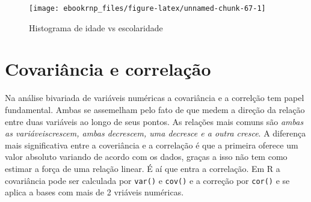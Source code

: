 \documentclass[12pt,]{style/krantz}
\makeatletter
\newenvironment{Shaded}{\begin{snugshade}}{\end{snugshade}}
\newcommand{\DataTypeTok}[1]{\textcolor[rgb]{0.13,0.29,0.53}{#1}}
\newcommand{\DecValTok}[1]{\textcolor[rgb]{0.00,0.00,0.81}{#1}}
\newcommand{\KeywordTok}[1]{\textcolor[rgb]{0.13,0.29,0.53}{\textbf{#1}}}
\newcommand{\NormalTok}[1]{#1}
\newcommand{\OperatorTok}[1]{\textcolor[rgb]{0.81,0.36,0.00}{\textbf{#1}}}
\newcommand{\OtherTok}[1]{\textcolor[rgb]{0.56,0.35,0.01}{#1}}
\newcommand{\StringTok}[1]{\textcolor[rgb]{0.31,0.60,0.02}{#1}}
\newenvironment{kframe}{%
\medskip{}
\setlength{\fboxsep}{.8em}
 \def\at@end@of@kframe{}%
 \ifinner\ifhmode%
  \def\at@end@of@kframe{\end{minipage}}%
  \begin{minipage}{\columnwidth}%
 \fi\fi%
 \def\FrameCommand##1{\hskip\@totalleftmargin \hskip-\fboxsep
 \colorbox{shadecolor}{##1}\hskip-\fboxsep
     \hskip-\linewidth \hskip-\@totalleftmargin \hskip\columnwidth}%
 \MakeFramed {\advance\hsize-\width
   \@totalleftmargin\z@ \linewidth\hsize
   \@setminipage}}%
 {\par\unskip\endMakeFramed%
 \at@end@of@kframe}
\renewenvironment{Shaded}{\begin{kframe}}{\end{kframe}}
\theoremstyle{definition}
\theoremstyle{definition}
\theoremstyle{definition}
\theoremstyle{remark}
\makeatother
\begin{document}
\begin{Shaded}
\end{Shaded}

\begin{figure}[H]

{\centering \texttt{[image: ebookrnp\_files/figure-latex/unnamed-chunk-67-1]} 

}

\caption{Histograma de idade vs escolaridade}\label{fig:unnamed-chunk-67}
\end{figure}

\hypertarget{covariancia-e-correlacao}{%
\section{Covariância e correlação}\label{covariancia-e-correlacao}}

Na análise bivariada de variáveis numéricas a covariância e a correlção tem papel fundamental. Ambas se assemelham pelo fato de que medem a direção da relação entre duas variáveis ao longo de seus pontos. As relações mais comuns são \emph{ambas as variáveiscrescem, ambas decrescem, uma decresce e a outra cresce}. A diferença mais significativa entre a coveriância e a correlação é que a primeira oferece um valor absoluto variando de acordo com os dados, graças a isso não tem como estimar a força de uma relação linear. É aí que entra a correlação. Em R a covariância pode ser calculada por \texttt{var()} e \texttt{cov()} e a correção por \texttt{cor()} e se aplica a bases com mais de 2 vriáveis numéricas.
\end{document}
